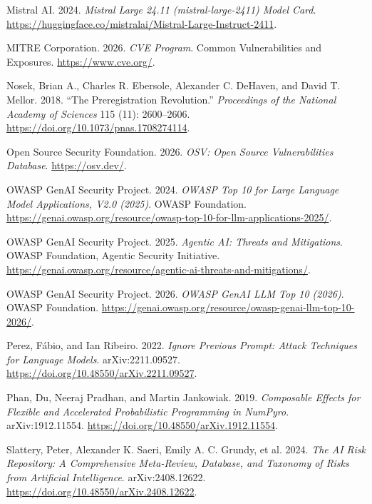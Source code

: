 \documentclass[11pt]{article}
\newlength{\cslhangindent}
\newenvironment{CSLReferences}[2] %
 {\begin{list}{}{%
  \setlength{\itemindent}{0pt}
  \setlength{\leftmargin}{0pt}
  \setlength{\parsep}{0pt}
  \ifodd #1
   \setlength{\leftmargin}{\cslhangindent}
   \setlength{\itemindent}{-1\cslhangindent}
  \fi
  \setlength{\itemsep}{#2\baselineskip}}}
 {\end{list}}
\begin{document}
\begin{CSLReferences}{1}{1}
Mistral AI. 2024. \emph{Mistral Large 24.11 ({mistral-large-2411}) Model
Card}.
\url{https://huggingface.co/mistralai/Mistral-Large-Instruct-2411}.

MITRE Corporation. 2026. \emph{{CVE} Program}. Common Vulnerabilities
and Exposures. \url{https://www.cve.org/}.

Nosek, Brian A., Charles R. Ebersole, Alexander C. DeHaven, and David T.
Mellor. 2018. {``The Preregistration Revolution.''} \emph{Proceedings of
the National Academy of Sciences} 115 (11): 2600--2606.
\url{https://doi.org/10.1073/pnas.1708274114}.

Open Source Security Foundation. 2026. \emph{{OSV}: Open Source
Vulnerabilities Database}. \url{https://osv.dev/}.

OWASP GenAI Security Project. 2024. \emph{{OWASP} Top 10 for Large
Language Model Applications, V2.0 (2025)}. OWASP Foundation.
\url{https://genai.owasp.org/resource/owasp-top-10-for-llm-applications-2025/}.

OWASP GenAI Security Project. 2025. \emph{Agentic {AI}: Threats and
Mitigations}. OWASP Foundation, Agentic Security Initiative.
\url{https://genai.owasp.org/resource/agentic-ai-threats-and-mitigations/}.

OWASP GenAI Security Project. 2026. \emph{{OWASP} {GenAI} {LLM} Top 10
(2026)}. OWASP Foundation.
\url{https://genai.owasp.org/resource/owasp-genai-llm-top-10-2026/}.

Perez, Fábio, and Ian Ribeiro. 2022. \emph{Ignore Previous Prompt:
Attack Techniques for Language Models}. arXiv:2211.09527.
\url{https://doi.org/10.48550/arXiv.2211.09527}.

Phan, Du, Neeraj Pradhan, and Martin Jankowiak. 2019. \emph{Composable
Effects for Flexible and Accelerated Probabilistic Programming in
{NumPyro}}. arXiv:1912.11554.
\url{https://doi.org/10.48550/arXiv.1912.11554}.

Slattery, Peter, Alexander K. Saeri, Emily A. C. Grundy, et al. 2024.
\emph{The {AI} Risk Repository: A Comprehensive Meta-Review, Database,
and Taxonomy of Risks from Artificial Intelligence}. arXiv:2408.12622.
\url{https://doi.org/10.48550/arXiv.2408.12622}.


\end{CSLReferences}
\end{document}
